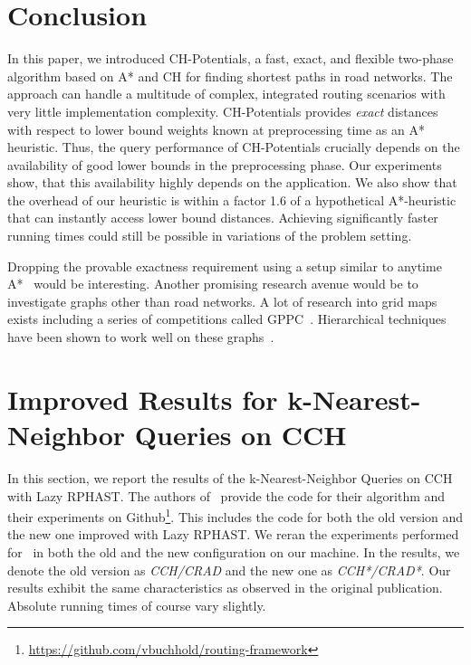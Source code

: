 \documentclass[manuscript,review]{acmart}
\begin{document}
\section{Conclusion}
\label{sec:conclusion}

In this paper, we introduced CH-Potentials, a fast, exact, and flexible two-phase algorithm based on A* and CH for finding shortest paths in road networks.
The approach can handle a multitude of complex, integrated routing scenarios with very little implementation complexity.
CH-Potentials provides \emph{exact} distances with respect to lower bound weights known at preprocessing time as an A* heuristic.
Thus, the query performance of CH-Potentials crucially depends on the availability of good lower bounds in the preprocessing phase.
Our experiments show, that this availability highly depends on the application.
We also show that the overhead of our heuristic is within a factor 1.6 of a hypothetical A*-heuristic that can instantly access lower bound distances.
Achieving significantly faster running times could still be possible in variations of the problem setting.

Dropping the provable exactness requirement using a setup similar to anytime A*~\cite{DBLP:conf/aaai/ZhouH02,DBLP:conf/nips/LikhachevGT03} would be interesting.
Another promising research avenue would be to investigate graphs other than road networks.
A lot of research into grid maps exists including a series of competitions called GPPC~\cite{DBLP:conf/socs/SturtevantTTUKS15}.
Hierarchical techniques have been shown to work well on these graphs~\cite{DBLP:conf/aaai/UrasK14}.






\appendix

\section{Improved Results for k-Nearest-Neighbor Queries on CCH}

In this section, we report the results of the k-Nearest-Neighbor Queries on CCH with Lazy RPHAST.
The authors of~\cite{buchhold_et_al:LIPIcs.SEA.2021.18} provide the code for their algorithm and their experiments on Github\footnote{\url{https://github.com/vbuchhold/routing-framework}}.
This includes the code for both the old version and the new one improved with Lazy RPHAST.
We reran the experiments performed for~\cite{buchhold_et_al:LIPIcs.SEA.2021.18} in both the old and the new configuration on our machine.
In the results, we denote the old version as \emph{CCH/CRAD} and the new one as \emph{CCH*/CRAD*}.
Our results exhibit the same characteristics as observed in the original publication.
Absolute running times of course vary slightly.
\end{document}
